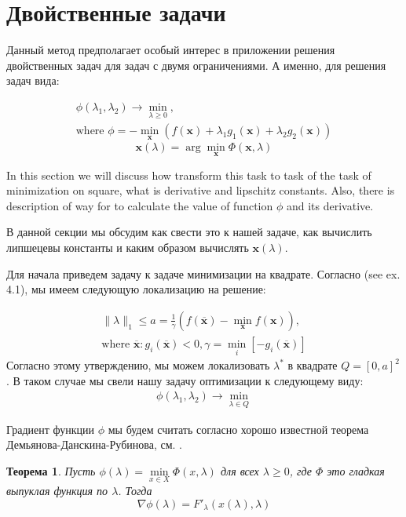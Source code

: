 \documentclass[12pt]{article}
\newtheorem{theorem}{Теорема}[section]
\begin{document}
\section{Двойственные задачи}
\label{details}

Данный метод предполагает особый интерес в приложении решения двойственных задач для задач с двумя ограничениями. А именно, для решения задач вида:

\begin{gather}
\phi(\lambda_1, \lambda_2) \rightarrow \min_{\lambda\geq 0},\\
\text{where } \phi = -\min_\textbf{x}\left(f(\textbf{x}) + \lambda_1 g_1(\textbf{x}) + \lambda_2 g_2(\textbf{x})\right)
\end{gather}
$$\textbf{x}(\lambda) = \arg\min_\textbf{x}\Phi(\textbf{x}, \lambda)$$

In this section we will discuss how transform this task to task of the task of minimization on square, what is derivative and lipschitz constants. Also, there is description of way for to calculate the value of function $\phi$ and its derivative.

В данной секции мы обсудим как свести это к нашей задаче, как вычислить липшецевы константы и каким образом вычислять $\textbf{x}(\lambda)$.

Для начала приведем задачу к задаче минимизации на квадрате. Согласно \cite{task} (see ex. 4.1), мы имеем следующую локализацию на решение:

\begin{gather}
\label{restr:dual}
\|{\lambda}\|_1 \leq a = \frac{1}{\gamma}\left(f(\overline{\textbf{x}}) -\min\limits_{\textbf{x}}f(\textbf{x})\right),\\
\text{where $\overline{\textbf{x}}:g_i(\overline{\textbf{x}})<0,\gamma = \min\limits_i[-g_i(\overline{\textbf{x}})]$}
\end{gather}
Согласно этому утверждению, мы можем локализовать $\lambda^*$ в квадрате $Q = [0, a]^2$. В таком случае мы свели нашу задачу оптимизации к следующему виду:
\begin{gather}
\label{dual}
\phi(\lambda_1, \lambda_2) \rightarrow \min_{\lambda \in Q}
\end{gather}

Градиент функции $\phi$ мы будем считать согласно хорошо известной теорема Демьянова-Данскина-Рубинова, см. \cite{DDR-theorem}.

\begin{theorem}
Пусть $\phi(\lambda)=\min\limits_{x\in X}\Phi(x,\lambda)$ для всех $\lambda\geq0$, где $\Phi$ это гладкая выпуклая функция по $\lambda$. Тогда
$$\nabla \phi(\lambda) = F'_\lambda\left(x(\lambda),\lambda\right)$$
\end{theorem}
\end{document}
